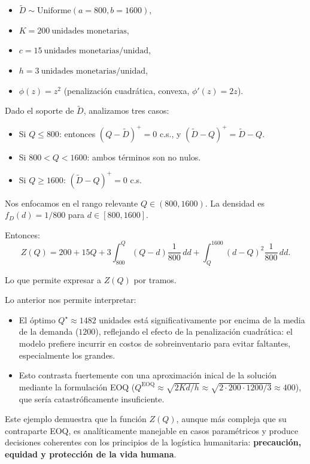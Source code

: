 \documentclass[
  spanish,
  us-letterpaper,
]{scrreprt}
\providecommand{\tightlist}{%
  \setlength{\itemsep}{0pt}\setlength{\parskip}{0pt}}
\numberwithin{equation}{section}
\begin{document}
\begin{itemize}
\tightlist
\item
  \(\tilde{D} \sim \text{Uniforme}(a=800, b=1600)\),
\item
  \(K = 200~\text{unidades monetarias}\),
\item
  \(c = 15~\text{unidades monetarias/unidad}\),
\item
  \(h = 3~\text{unidades monetarias/unidad}\),
\item
  \(\phi(z) = z^2\) (penalización cuadrática, convexa,
  \(\phi'(z) = 2z\)).
\end{itemize}

Dado el soporte de \(\tilde{D}\), analizamos tres casos:

\begin{itemize}
\tightlist
\item
  Si \(Q \leq 800\): entonces \((Q - \tilde{D})^+ = 0\) c.s., y
  \((\tilde{D} - Q)^+ = \tilde{D} - Q\).
\item
  Si \(800 < Q < 1600\): ambos términos son no nulos.
\item
  Si \(Q \geq 1600\): \((\tilde{D} - Q)^+ = 0\) c.s.
\end{itemize}

Nos enfocamos en el rango relevante \(Q \in (800, 1600)\). La densidad
es \(f_D(d) = 1/800\) para \(d \in [800, 1600]\).

Entonces: \[
Z(Q) = 200 + 15Q + 3 \int_{800}^Q (Q - d) \frac{1}{800} \, dd + \int_Q^{1600} (d - Q)^2 \frac{1}{800} \, dd.
\]

Lo que permite expresar a \(Z(Q)\) por tramos.

Lo anterior nos permite interpretar:

\begin{itemize}
\tightlist
\item
  El óptimo \(Q^\star \approx 1482\) unidades está significativamente
  por encima de la media de la demanda (\(1200\)), reflejando el efecto
  de la penalización cuadrática: el modelo prefiere incurrir en costos
  de sobreinventario para evitar faltantes, especialmente los grandes.\\
\item
  Esto contrasta fuertemente con una aproximación inical de la solución
  mediante la formulación EOQ
  (\(Q^{\text{EOQ}} \approx \sqrt{2Kd/h} \approx \sqrt{2\cdot200\cdot1200/3} \approx 400\)),
  que sería catastróficamente insuficiente.
\end{itemize}

Este ejemplo demuestra que la función \(Z(Q)\), aunque más compleja que
su contraparte EOQ, es analíticamente manejable en casos paramétricos y
produce decisiones coherentes con los principios de la logística
humanitaria: \textbf{precaución, equidad y protección de la vida
humana}.
\end{document}
